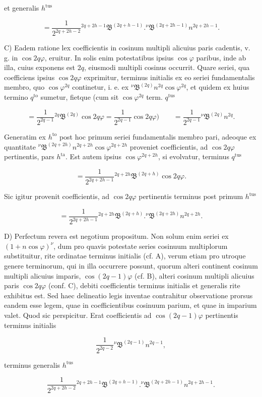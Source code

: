 \par\noindent{}%
et generalis $h^{\text{tus}}$

\[
= \frac{1}{2^{2q+2h-2}} {}^{2q+2h-1}\mathfrak{B}^{(2q+h-1)}  .  {}^{\nu}\mathfrak{B}^{(2q+2h-1)} n^{2q+2h-1}.
\]

C) Eadem ratione lex coefficientis in cosinum multipli alicuius paris cadentis, v. g. in $\cos 2q\varphi$, eruitur. In solis enim potestatibus ipsius $\cos\varphi$ paribus, inde ab illa, cuius exponens est $2q$, eiusmodi multipli cosinus occurrit. Quare seriei, qua coefficiens ipsius $\cos 2q\varphi$ exprimitur, terminus initialis ex eo seriei fundamentalis membro, quo $\cos\varphi^{2q}$ continetur, i. e. ex ${}^{\nu}\mathfrak{B}^{(2q)} n^{2q}\cos\varphi^{2q}$, et quidem ex huius termino $q^{\text{to}}$ sumetur, fietque (cum sit $\cos\varphi^{2q}$ term. $q^{\text{tus}}$

\[
= \frac{1}{2^{2q-1}} {}^{2q}\mathfrak{B}^{(2q)} \cos 2q\varphi = \frac{1}{2^{2q-1}} \cos 2q\varphi) \qquad = \frac{1}{2^{2q-1}} {}^{\nu}\mathfrak{B}^{(2q)} n^{2q}.
\]

\noindent Generatim ex $h^{\text{to}}$ post hoc primum seriei fundamentalis membro pari, adeoque ex quantitate ${}^{\nu}\mathfrak{B}^{(2q+2h)} n^{2q+2h} \cos\varphi^{2q+2h}$ proveniet coefficientis, ad $\cos 2q\varphi$ pertinentis, pars $h^{\text{ta}}$. Est autem ipsius $\cos\varphi^{2q+2h}$, si evolvatur, terminus $q^{\text{tus}}$

\[
= \frac{1}{2^{2q+2h-1}} {}^{2q+2h}\mathfrak{B}^{(2q+h)} \cos 2q\varphi.
\]

\noindent Sic igitur provenit coefficientis, ad $\cos 2q\varphi$ pertinentis terminus post primum $h^{\text{tus}}$

\[
= \frac{1}{2^{2q+2h-1}} {}^{2q+2h}\mathfrak{B}^{(2q+h)}  .  {}^{\nu}\mathfrak{B}^{(2q+2h)} n^{2q+2h}.
\]

D) Perfectum revera est negotium propositum. Non solum enim seriei ex $(1+n\cos\varphi)^{\nu}$, dum pro quavis potestate series cosinuum multiplorum substituitur, rite ordinatae terminus initialis (cf. A), verum etiam pro utroque genere terminorum, qui in illa occurrere possunt, quorum alteri continent cosinum multipli alicuius imparis, $\cos(2q-1)\varphi$ (cf. B), alteri cosinum multipli alicuius paris $\cos 2q\varphi$ (conf. C), debiti coefficientis terminus initialis et generalis rite exhibitus est. Sed haec delineatio legis inventae contrahitur observatione prorsus eandem esse legem, quae in coefficientibus cosinuum parium, et quae in imparium valet. Quod sic perspicitur. Erat coefficientis ad $\cos(2q-1)\varphi$ pertinentis terminus initialis

\[
\frac{1}{2^{2q-2}} {}^{\nu}\mathfrak{B}^{(2q-1)} n^{2q-1},
\]

\noindent terminus generalis $h^{\text{tus}}$

\[
\frac{1}{2^{2q+2h-2}} {}^{2q+2h-1}\mathfrak{B}^{(2q+h-1)}  .  {}^{\nu}\mathfrak{B}^{(2q+2h-1)} n^{2q+2h-1}.
\]

